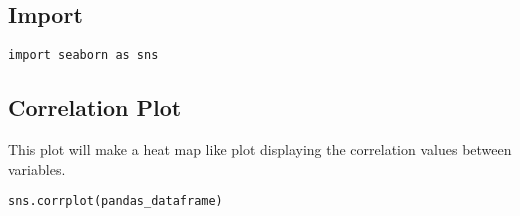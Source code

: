 \subsection{Import}
\begin{lstlisting}
import seaborn as sns
\end{lstlisting}

\subsection{Correlation Plot}
This plot will make a heat map like plot displaying the correlation values
between variables.
\begin{lstlisting}
sns.corrplot(pandas_dataframe)
\end{lstlisting}

